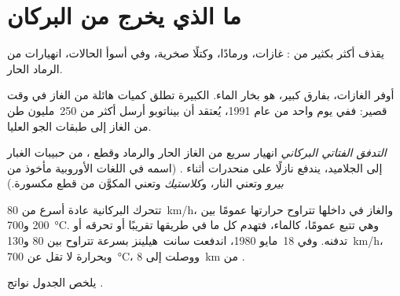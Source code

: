\section{ما الذي يخرج من البركان}

يقذف  أكثر بكثير من : غازات، ورمادًا، وكتلًا صخرية،
وفي أسوأ الحالات، انهيارات من الرماد الحار.

أوفر الغازات، بفارق كبير، هو بخار الماء.  الكبيرة تطلق
كميات هائلة من الغاز في وقت قصير: ففي يوم واحد من عام 1991، يُعتقد أن بيناتوبو
أرسل أكثر من 250~مليون طن من الغاز إلى طبقات الجو
العليا.

\begin{definition}\label{def:g7:volcanoes:pyroclastic-flow}
\emph{التدفق الفتاتي البركاني} انهيار سريع من
الغاز الحار والرماد وقطع ، من حبيبات الغبار إلى الجلاميد، يندفع
نازلًا على منحدرات  أثناء .
(اسمه في اللغات الأوروبية مأخوذ من \emph{بيرو} وتعني النار، و\emph{كلاستيك} وتعني المكوَّن من قطع مكسورة.)
\end{definition}

تتحرك  البركانية عادة أسرع من \qty{80}{km/h}، 
والغاز في داخلها تتراوح حرارتها عمومًا بين 200 و\qty{700}{\degreeCelsius}.
وهي تتبع  عمومًا، كالماء، فتهدم كل ما في طريقها تقريبًا أو تحرقه أو
تدفنه. وفي 18~مايو 1980، اندفعت  
سانت~هيلينز بسرعة تتراوح بين 80 و\qty{130}{km/h}، وبحرارة لا تقل عن
\qty{700}{\degreeCelsius}، ووصلت إلى \qty{8}{km} من .

يلخص الجدول نواتج .


